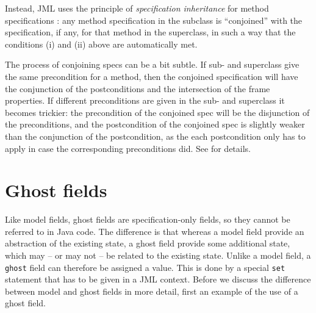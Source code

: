 \documentclass{llncs}
\begin{document}
Instead, JML uses the principle of \emph{specification inheritance} 
for method specifications \cite{Dhara-Leavens96}: any method specification
in the subclass is ``conjoined'' with the specification, if any, for that
method in the superclass, in such a way that the conditions (i) and (ii) above 
are automatically met.

The process of conjoining specs can be a bit subtle.  If sub- and superclass
give the same precondition for a method, then the conjoined specification will
have the conjunction of the postconditions and the intersection of the frame
properties.  If different preconditions are given in the sub- and superclass it
becomes trickier: the precondition of the conjoined spec will be the
disjunction of the preconditions, and the postcondition of the conjoined spec
is slightly weaker than the conjunction of the postcondition, as the each
postcondition only has to apply in case the corresponding preconditions did.
See \cite{Dhara-Leavens96} for details.


% 



\section{Ghost fields}
\label{Sec:ghost}


Like model fields, ghost fields are specification-only fields,
so they cannot be referred to in Java code.
The difference is that whereas a model field provide an abstraction
of the existing state, a ghost field provide some additional state,
which may -- or may not -- be related to the existing state.
Unlike a model field, a \texttt{ghost} field can therefore
be assigned a value. This is done by a special \texttt{set} statement
that has to be given in a JML context.
Before we discuss the difference between model and ghost fields
in more detail, first an example of the use of a ghost field.
\end{document}
